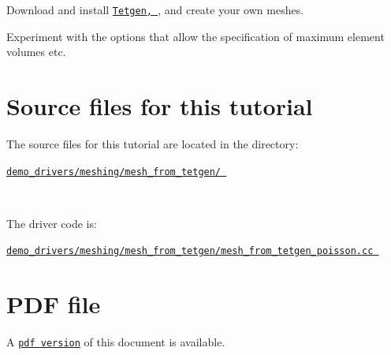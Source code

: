 \begin{DoxyEnumerate}
\item Download and install \href{http://wias-berlin.de/software/tetgen//}{\tt {\ttfamily Tetgen}, }, and create your own meshes.
\item Experiment with the options that allow the specification of maximum element volumes etc.
\end{DoxyEnumerate}



 

\hypertarget{index_sources}{}\section{Source files for this tutorial}\label{index_sources}

\begin{DoxyItemize}
\item The source files for this tutorial are located in the directory\+:~\newline
~\newline
\begin{center} \href{../../../../demo_drivers/meshing/mesh_from_tetgen/}{\tt demo\+\_\+drivers/meshing/mesh\+\_\+from\+\_\+tetgen/ } \end{center} ~\newline

\item The driver code is\+: ~\newline
~\newline
\begin{center} \href{../../../../demo_drivers/meshing/mesh_from_tetgen/mesh_from_tetgen_poisson.cc}{\tt demo\+\_\+drivers/meshing/mesh\+\_\+from\+\_\+tetgen/mesh\+\_\+from\+\_\+tetgen\+\_\+poisson.\+cc } \end{center} 
\end{DoxyItemize}



 

 \hypertarget{index_pdf}{}\section{P\+D\+F file}\label{index_pdf}
A \href{../latex/refman.pdf}{\tt pdf version} of this document is available. 
